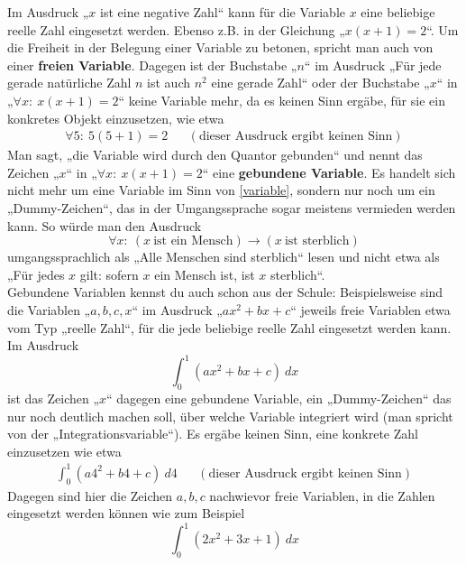 \begin{bem}
 Im Ausdruck „$x$ ist eine negative Zahl“ kann für die Variable $x$ eine beliebige reelle Zahl eingesetzt werden. Ebenso z.B. in der Gleichung „$x(x+1)=2$“. Um die Freiheit in der Belegung einer Variable zu betonen, spricht man auch von einer \textbf{freien Variable}. Dagegen ist der Buchstabe „$n$“ im Ausdruck „Für jede gerade natürliche Zahl $n$ ist auch $n^2$ eine gerade Zahl“ oder der Buchstabe „$x$“ in „$\forall x:\ x(x+1)=2$“ keine Variable mehr, da es keinen Sinn ergäbe, für sie ein konkretes Objekt einzusetzen, wie etwa
 \begin{align*}
  \forall 5:\ 5(5+1) = 2 && (\text{dieser Ausdruck ergibt keinen Sinn})
 \end{align*}
 Man sagt, „die Variable wird durch den Quantor gebunden“ und nennt das Zeichen „$x$“ in „$\forall x:\ x(x+1)=2$“ eine \textbf{gebundene Variable}. Es handelt sich nicht mehr um eine Variable im Sinn von \cref{variable}, sondern nur noch um ein „Dummy-Zeichen“, das in der Umgangssprache sogar meistens vermieden werden kann. So würde man den Ausdruck
  \[ \forall x:\ (x\ \text{ist ein Mensch})\to (x\ \text{ist sterblich}) \]
  umgangssprachlich als „Alle Menschen sind sterblich“ lesen und nicht etwa als „Für jedes $x$ gilt: sofern $x$ ein Mensch ist, ist $x$ sterblich“. \\
  Gebundene Variablen kennst du auch schon aus der Schule: Beispielsweise sind die Variablen „$a,b,c,x$“ im Ausdruck „$ax^2 +bx+c$“ jeweils freie Variablen etwa vom Typ „reelle Zahl“, für die jede beliebige reelle Zahl eingesetzt werden kann. Im Ausdruck
  \[ \int_0^1 (ax^2+bx+c)\ dx \]
  ist das Zeichen „$x$“ dagegen eine gebundene Variable, ein „Dummy-Zeichen“ das nur noch deutlich machen soll, über welche Variable integriert wird (man spricht von der „Integrationsvariable“). Es ergäbe keinen Sinn, eine konkrete Zahl einzusetzen wie etwa
  \begin{align*}
  \int_0^1 (a4^2+b4+c)\ d4 && (\text{dieser Ausdruck ergibt keinen Sinn})
   \end{align*}
Dagegen sind hier die Zeichen $a,b,c$ nachwievor freie Variablen, in die Zahlen eingesetzt werden können wie zum Beispiel
\[ \int_0^1 (2x^2+3x+1)\ dx\]
\end{bem}


